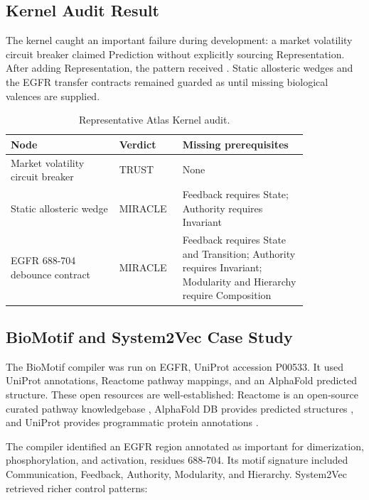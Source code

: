 \documentclass[11pt]{article}
\newcommand{\code}[1]{\texttt{\detokenize{#1}}}
\begin{document}
\subsection{Kernel Audit Result}

The kernel caught an important failure during development: a market volatility
circuit breaker claimed Prediction without explicitly sourcing Representation.
After adding Representation, the pattern received \code{TRUST}. Static
allosteric wedges and the EGFR transfer contracts remained guarded as
\code{MIRACLE} until missing biological valences are supplied.

\begin{table}[h]
\centering
\caption{Representative Atlas Kernel audit.}
\small
\begin{tabular}{L{0.32\linewidth}L{0.14\linewidth}L{0.37\linewidth}}
\toprule
Node & Verdict & Missing prerequisites \\
\midrule
Market volatility circuit breaker & TRUST & None \\
Static allosteric wedge & MIRACLE & Feedback requires State; Authority requires Invariant \\
EGFR 688-704 debounce contract & MIRACLE & Feedback requires State and Transition; Authority requires Invariant; Modularity and Hierarchy require Composition \\
\bottomrule
\end{tabular}
\end{table}

\subsection{BioMotif and System2Vec Case Study}

The BioMotif compiler was run on EGFR, UniProt accession P00533. It used
UniProt annotations, Reactome pathway mappings, and an AlphaFold predicted
structure. These open resources are well-established: Reactome is an
open-source curated pathway knowledgebase \cite{reactome2024}, AlphaFold DB
provides predicted structures \cite{alphafold2021}, and UniProt provides
programmatic protein annotations \cite{uniprot2023}.

The compiler identified an EGFR region annotated as important for dimerization,
phosphorylation, and activation, residues 688-704. Its motif signature included
Communication, Feedback, Authority, Modularity, and Hierarchy. System2Vec
retrieved richer control patterns:
\end{document}
